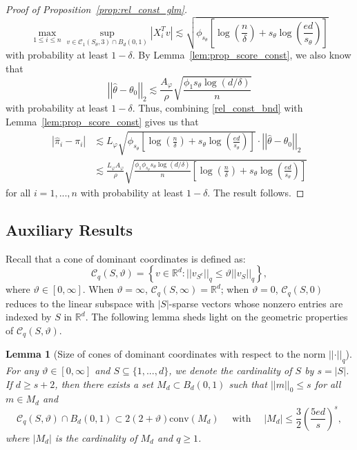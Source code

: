 \documentclass[ejsv2,noshowframe]{imsart}
\theoremstyle{plain}
\newtheorem{lemma}[theorem]{Lemma}
\theoremstyle{definition}
\theoremstyle{remark}
\newcommand{\norm}[1]{\left|\left| #1 \right|\right|}
\renewcommand{\hat}{\widehat}
\begin{document}
\begin{proof}[Proof of Proposition~\ref{prop:rel_const_glm}]
	$$\max_{1\leq i \leq n}\sup_{v\in \mathcal{C}_1(S_{\theta},3)\cap B_d(0,1)}\left|X_i^Tv\right| \lesssim \sqrt{\phi_{s_{\theta}}\left[\log\left(\frac{n}{\delta}\right) + s_{\theta} \log\left(\frac{e d}{s_{\theta}} \right) \right]}$$
	with probability at least $1-\delta$. By Lemma~\ref{lem:prop_score_const}, we also know that 
	$$\norm{\hat{\theta} - \theta_0}_2 \lesssim \frac{A_{\varphi}}{\rho} \sqrt{\frac{\phi_1 s_{\theta} \log(d/\delta)}{n}}$$
	with probability at least $1-\delta$. Thus, combining \eqref{rel_const_bnd} with Lemma~\ref{lem:prop_score_const} gives us that
	\begin{align*}
		\left|\hat{\pi}_i - \pi_i \right| &\lesssim L_{\varphi} \sqrt{\phi_{s_{\theta}}\left[\log\left(\frac{n}{\delta}\right) + s_{\theta} \log\left(\frac{e d}{s_{\theta}} \right) \right]} \cdot \norm{\hat{\theta}-\theta_0}_2\\
		&\lesssim \frac{L_{\varphi} A_{\varphi}}{\rho} \sqrt{\frac{\phi_1 \phi_{s_{\theta}} s_{\theta} \log(d/\delta)}{n}\left[\log\left(\frac{n}{\delta}\right) + s_{\theta} \log\left(\frac{e d}{s_{\theta}} \right) \right]}
	\end{align*}
	for all $i=1,...,n$ with probability at least $1-\delta$. The result follows.
\end{proof}



\subsection{Auxiliary Results}
\label{subapp:auxi_res}

Recall that a cone of dominant coordinates is defined as:
$$\mathcal{C}_q(S,\vartheta)=\left\{v\in \mathbb{R}^d: \norm{v_{S^c}}_q \leq \vartheta \norm{v_S}_q \right\},$$
where $\vartheta \in [0,\infty]$. When $\vartheta=\infty$, $\mathcal{C}_q(S,\infty)=\mathbb{R}^d$; when $\vartheta=0$, $\mathcal{C}_q(S,0)$ reduces to the linear subspace with $|S|$-sparse vectors whose nonzero entries are indexed by $S$ in $\mathbb{R}^d$. The following lemma sheds light on the geometric properties of $\mathcal{C}_q(S,\vartheta)$.

\begin{lemma}[Size of cones of dominant coordinates with respect to the norm $\norm{\cdot}_q$]
	\label{lem:size_dom_cone}
	For any $\vartheta \in [0,\infty]$ and $S \subseteq \{1,...,d\}$, we denote the cardinality of $S$ by $s=|S|$. If $d\geq s+2$, then there exists a set $M_d \subset B_d(0,1)$ such that $\norm{m}_0 \leq s$ for all $m\in M_d$ and
	$$\mathcal{C}_q(S,\vartheta) \cap B_d(0,1) \subset 2(2+\vartheta) \mathrm{conv}(M_d)\quad \text{ with } \quad |M_d| \leq \frac{3}{2}\left(\frac{5ed}{s} \right)^s,$$
	where $|M_d|$ is the cardinality of $M_d$ and $q\geq 1$. 
\end{lemma} 
\end{document}

